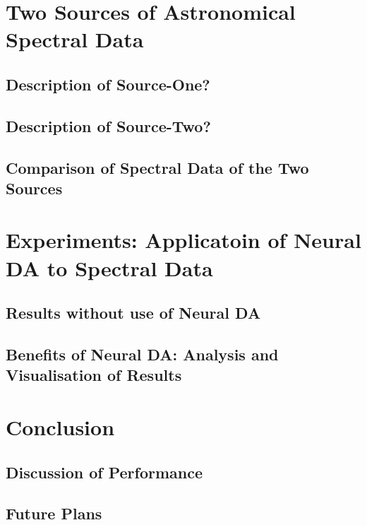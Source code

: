 \documentclass[thesis=M,english]{FITthesis}[2012/10/20]
\begin{document}
\chapter{Two Sources of Astronomical Spectral Data}
\label{data_chapter}

\section{Description of Source-One?}

\section{Description of Source-Two?}

\section{Comparison of Spectral Data of the Two Sources}

\chapter{Experiments: Applicatoin of Neural DA to Spectral Data}
\label{exp_chapter}

\section{Results without use of Neural DA}

\section{Benefits of Neural DA: Analysis and Visualisation of Results}

\chapter{Conclusion}

\section{Discussion of Performance}

\section{Future Plans}




\appendix
\end{document}
